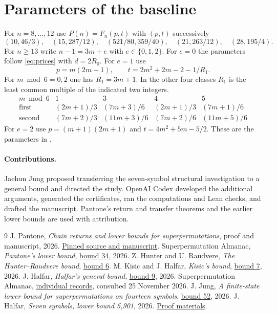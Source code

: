 \documentclass[11pt]{article}
\begin{document}
\section*{Parameters of the baseline}
For $n=8,\ldots,12$ use $P(n)=F_n(p,t)$ with $(p,t)$ successively
\[
 (10,46/3),\quad(15,287/12),\quad(521/80,359/40),\quad
 (21,263/12),\quad(28,195/4).
\]
For $n\ge13$ write $n-1=3m+e$ with $e\in\{0,1,2\}$.
For $e=0$ the parameters follow \eqref{eq:prices} with $d=2R_0$.
For $e=1$ use
\[
 p=m(2m+1),\qquad t=2m^2+2m-2-1/R_1.
\]
For $m\bmod6=0,2$ one has $R_1=3m+1$. In the other four classes
$R_1$ is the least common multiple of the indicated two integers.
\[
\begin{array}{c|cccc}
m\bmod6 &1&3&4&5\\ \hline
\text{first}&(2m+1)/3&(7m+3)/6&(2m+1)/3&(7m+1)/6\\
\text{second}&(7m+2)/3&(11m+3)/6&(7m+2)/6&(11m+5)/6
\end{array}
\]
For $e=2$ use $p=(m+1)(2m+1)$ and $t=4m^2+5m-5/2$.
These are the parameters in \cite{pantone,record34}.

\paragraph{Contributions.}
Jaehun Jung proposed transferring the seven-symbol structural investigation
to a general bound and directed the study. OpenAI Codex developed the
additional arguments, generated the certificates, ran the computations
and Lean checks, and drafted the manuscript. Pantone's return and transfer
theorems and the earlier lower bounds are used with attribution.

\begin{thebibliography}{9}
 J. Pantone, \emph{Chain returns and lower bounds for
superpermutations}, proof and manuscript, 2026. \href{https://github.com/jaypantone/2026-10-superpermutation-lower-palomar/tree/ad72ab5010e945b5c8768a918281778c834dcc40}{Pinned source and manuscript}.
 Superpermutation Almanac, \emph{Pantone's lower bound},
\href{https://superpermutations.com/b/34}{bound 34}, 2026.
 Z. Hunter and U. Raudvere, \emph{The Hunter--Raudvere bound},
\href{https://superpermutations.com/b/6}{bound 6}. M. Kisic and J. Halfar,
\emph{Kisic's bound}, \href{https://superpermutations.com/b/7}{bound 7}, 2026.
 J. Halfar, \emph{Halfar's general bound},
\href{https://superpermutations.com/b/9}{bound 9}, 2026.
 Superpermutation Almanac, \href{https://superpermutations.com/}{individual records},
consulted 25 November 2026.
 J. Jung, \emph{A finite-state lower bound for superpermutations
on fourteen symbols}, \href{https://superpermutations.com/b/52}{bound 52}, 2026.
 J. Halfar, \emph{Seven symbols, lower bound 5,901}, 2026.
\href{https://github.com/jhalfar/superpermutations/tree/8e3c02b5234b49a1422751f86f9e472706082374/proofs/n7_5901}{Proof materials}.
\end{thebibliography}
\end{document}
